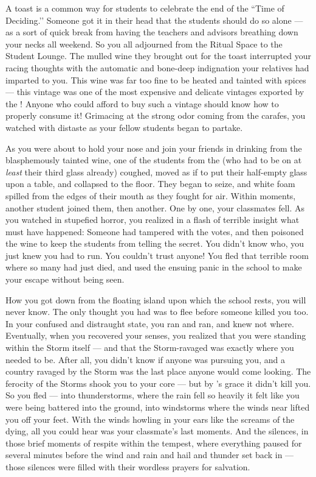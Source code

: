 \documentclass[char]{GL2020}
\begin{document}
A toast is a common way for students to celebrate the end of the ``Time of Deciding.’’ Someone got it in their head that the students should do so alone — as a sort of quick break from having the teachers and advisors breathing down your necks all weekend. So you all adjourned from the Ritual Space to the Student Lounge. The mulled wine they brought out for the toast interrupted your racing thoughts with the automatic and bone-deep indignation your \pFarm{} relatives had imparted to you. This wine was far too fine to be heated and tainted with spices — this vintage was one of the most expensive and delicate vintages exported by the \pFarm{}! Anyone who could afford to buy such a vintage should know how to properly consume it! Grimacing at the strong odor coming from the carafes, you watched with distaste as your fellow students began to partake.

As you were about to hold your nose and join your friends in drinking from the blasphemously tainted wine, one of the students from the \pFarm{} (who had to be on at \emph{least} their third glass already) coughed, moved as if to put their half-empty glass upon a table, and collapsed to the floor. They began to seize, and white foam spilled from the edges of their mouth as they fought for air. Within moments, another student joined them, then another. One by one, your classmates fell. As you watched in stupefied horror, you realized in a flash of terrible insight what must have happened: Someone had tampered with the votes, and then poisoned the wine to keep the students from telling the secret. You didn't know who, you just knew you had to run. You couldn't trust anyone! You fled that terrible room where so many had just died, and used the ensuing panic in the school to make your escape without being seen.

How you got down from the floating island upon which the school rests, you will never know. The only thought you had was to flee before someone killed you too. In your confused and distraught state, you ran and ran, and knew not where. Eventually, when you recovered your senses, you realized that you were standing within the Storm itself — and that the Storm-ravaged \pShip{} was exactly where you needed to be. After all, you didn't know if anyone was pursuing you, and a country ravaged by the Storm was the last place anyone would come looking. The ferocity of the Storms shook you to your core — but by \cFarmGod{}'s grace it didn't kill you. So you fled — into thunderstorms, where the rain fell so heavily it felt like you were being battered into the ground, into windstorms where the winds near lifted you off your feet. With the winds howling in your ears like the screams of the dying, all you could hear was your classmate's last moments. And the silences, in those brief moments of respite within the tempest, where everything paused for several minutes before the wind and rain and hail and thunder set back in — those silences were filled with their wordless prayers for salvation.
\end{document}

